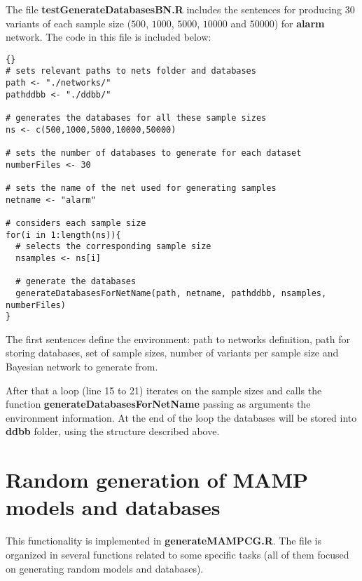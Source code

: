 \documentclass[11pt,professionalfont]{article}
\begin{document}
The file \textbf{testGenerateDatabasesBN.R} includes the sentences for producing 
$30$ variants of each sample size ($500$, $1000$, $5000$, $10000$ and $50000$) 
for \textbf{alarm} network. The code in this file is included below:

\begin{small}
\lstset{linewidth=150mm}
\begin{lstlisting}[]{}
# sets relevant paths to nets folder and databases
path <- "./networks/"
pathddbb <- "./ddbb/"

# generates the databases for all these sample sizes
ns <- c(500,1000,5000,10000,50000)

# sets the number of databases to generate for each dataset
numberFiles <- 30

# sets the name of the net used for generating samples
netname <- "alarm"

# considers each sample size
for(i in 1:length(ns)){
  # selects the corresponding sample size
  nsamples <- ns[i]
  
  # generate the databases
  generateDatabasesForNetName(path, netname, pathddbb, nsamples, numberFiles)
}
\end{lstlisting}
\end{small}

The first sentences define the environment: path to networks definition, 
path for storing databases, set of sample sizes, number of variants per 
sample size and Bayesian network to generate from.

\medskip

After that a loop (line 15 to 21) iterates on the sample sizes and calls the 
function \textbf{generateDatabasesForNetName} passing as arguments the environment 
information. At the end of the loop the databases will be stored into \textbf{ddbb}
folder, using the structure described above.

\section{Random generation of MAMP models and databases}

This functionality is implemented in \textbf{generateMAMPCG.R}. The
file is organized in several functions related to some specific tasks (all
of them focused on generating random models and databases). 
\end{document}
